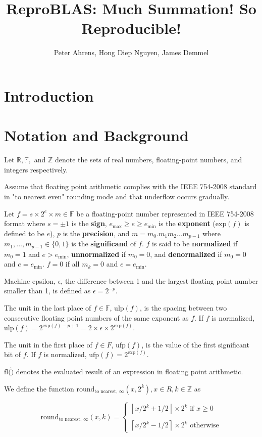 \documentclass[12pt]{article}
\author{Peter Ahrens, Hong Diep Nguyen, James Demmel}
\title{ReproBLAS: Much Summation! So Reproducible!}
\providecommand{\ceil}[1]{\left \lceil #1 \right \rceil }
\providecommand{\floor}[1]{\left \lfloor #1 \right \rfloor }
\providecommand{\R}{\ensuremath{\mathbb{R}}}
\providecommand{\F}{\ensuremath{\mathbb{F}}}
\providecommand{\Z}{\ensuremath{\mathbb{Z}}}
\providecommand{\exp}{\ensuremath{\text{exp}}}
\providecommand{\min}{\ensuremath{\text{min}}}
\providecommand{\max}{\ensuremath{\text{max}}}
\providecommand{\ulp}{\ensuremath{\text{ulp}}}
\providecommand{\ufp}{\ensuremath{\text{ufp}}}
\providecommand{\fl}{\ensuremath{\text{fl}}}
\providecommand{\roundtonearestinfty}{\ensuremath{\text{round}_\text{to nearest, $\infty$}}}
\theoremstyle{plain}
\begin{document}
\noindent
\maketitle
\tableofcontents
\newpage
\section{Introduction}

\section{Notation and Background}
  Let $\R, \F, $ and $\Z$ denote the sets of real numbers, floating-point numbers, and integers respectively.

  Assume that floating point arithmetic complies with the IEEE 754-2008 standard \cite{ieee754} in "to nearest even" rounding mode and that underflow occurs gradually.

  Let $f = s \times 2^e \times m \in \F$ be a floating-point number represented in IEEE 754-2008 format \cite{ieee754} where $s = \pm 1$ is the \textbf{sign}, $e_{\max} \geq e \geq e_{\min}$ is the \textbf{exponent} ($\exp(f)$ is defined to be $e$), $p$ is the \textbf{precision}, and $m = m_0.m_1m_2...m_{p-1}$ where $m_1, ..., m_{p - 1} \in \{0, 1\}$ is the \textbf{significand} of $f$. $f$ is said to be \textbf{normalized} if $m_0 = 1$ and $e > e_{\min}$, \textbf{unnormalized} if $m_0 = 0$, and \textbf{denormalized} if $m_0 = 0$ and $e = e_{\min}$. $f = 0$ if all $m_k = 0$ and $e = e_{\min}$.

  Machine epsilon, $\epsilon$, the difference between 1 and the largest floating point number smaller than 1, is defined as $\epsilon = 2^{-p}$.

  The unit in the last place of $f \in \F$, $\ulp(f)$, is the spacing between two consecutive floating point numbers of the same exponent as $f$. If $f$ is normalized, $\ulp(f) = 2^{\exp(f) - p + 1} = 2 \times \epsilon \times 2^{\exp(f)}$.

  The unit in the first place of $f \in F$, $\ufp(f)$, is the value of the first significant bit of $f$. If $f$ is normalized, $\ufp(f) = 2^{\exp(f)}$.

  $\fl(\dot)$ denotes the evaluated result of an expression in floating point arithmetic.

  We define the function $\roundtonearestinfty(x, 2^k), x \in R, k \in \Z$ as

  \begin{equation*}
  \roundtonearestinfty(x, k) = \begin{cases}\floor{x/2^k + 1/2} \times 2^k \text{ if } x \geq 0\\ \\ \ceil{x/2^k - 1/2}\times 2^k \text{ otherwise}\end{cases}
  \end{equation*}
\end{document}
